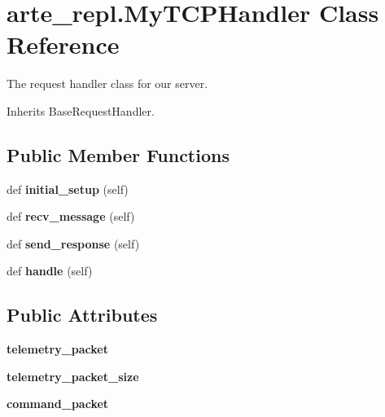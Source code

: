 \section{arte\+\_\+repl.\+My\+T\+C\+P\+Handler Class Reference}
\label{classarte__repl_1_1_my_t_c_p_handler}


The request handler class for our server.  




Inherits Base\+Request\+Handler.

\subsection*{Public Member Functions}
\begin{DoxyCompactItemize}
\item 
def {\bfseries initial\+\_\+setup} (self)\label{classarte__repl_1_1_my_t_c_p_handler_a171ab6d58f11065a187d076c4fec3533}

\item 
def {\bfseries recv\+\_\+message} (self)\label{classarte__repl_1_1_my_t_c_p_handler_abd92adf3863c16f07dd08e829266efef}

\item 
def {\bfseries send\+\_\+response} (self)\label{classarte__repl_1_1_my_t_c_p_handler_a8bde7a8a6a71b50d097cfdc90555e3f6}

\item 
def {\bfseries handle} (self)\label{classarte__repl_1_1_my_t_c_p_handler_af475670bfcc147a6bf1aa4c4c46f5ab2}

\end{DoxyCompactItemize}
\subsection*{Public Attributes}
\begin{DoxyCompactItemize}
\item 
{\bfseries telemetry\+\_\+packet}\label{classarte__repl_1_1_my_t_c_p_handler_a579be1bc92e7e78d922769c547615875}

\item 
{\bfseries telemetry\+\_\+packet\+\_\+size}\label{classarte__repl_1_1_my_t_c_p_handler_af0aa21f3fd3de3ec3c049b59fddc497c}

\item 
{\bfseries command\+\_\+packet}\label{classarte__repl_1_1_my_t_c_p_handler_aeb60fd641c5157d5ab7c811e8ca25fab}

\end{DoxyCompactItemize}


